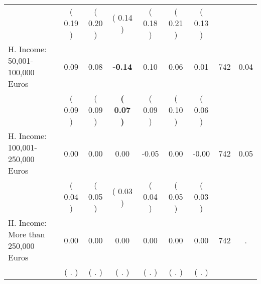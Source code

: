 \begin{tabular}{lcccccccc}
 & (     0.19 ) & (     0.20 ) & (     0.14 ) & (     0.18 ) & (     0.21 ) & (     0.13 ) & \\
H. Income: 50,001-100,000 Euros &      0.09 &      0.08 & \textbf{    -0.14} &      0.10 &      0.06 &      0.01 & 742 &       0.04 \\ 
 & (     0.09 ) & (     0.09 ) & \textbf{(     0.07 )} & (     0.09 ) & (     0.10 ) & (     0.06 ) & \\
H. Income: 100,001-250,000 Euros &      0.00 &      0.00 &      0.00 &     -0.05 &      0.00 &     -0.00 & 742 &       0.05 \\ 
 & (     0.04 ) & (     0.05 ) & (     0.03 ) & (     0.04 ) & (     0.05 ) & (     0.03 ) & \\
H. Income: More than 250,000 Euros &      0.00 &      0.00 &      0.00 &      0.00 &      0.00 &      0.00 & 742 &          . \\ 
 & (        . ) & (        . ) & (        . ) & (        . ) & (        . ) & (        . ) & \\
\bottomrule
\end{tabular}
